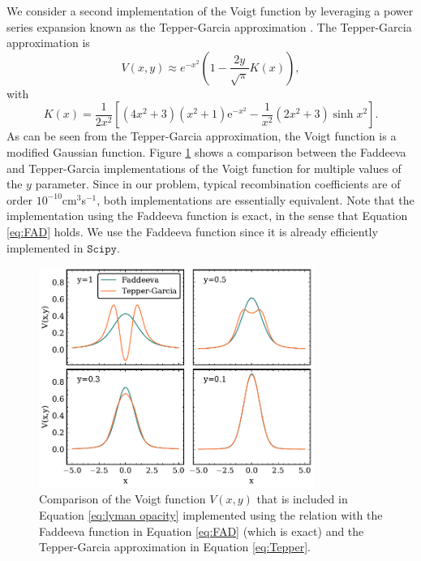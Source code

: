We consider a second implementation of the Voigt function by leveraging a power series expansion known as the Tepper-Garcia approximation \cite{Tepper_Garc_a_2006}. The Tepper-Garcia approximation is
\begin{equation}\label{eq:Tepper}
        V(x,y)\approx e^{-x^2}\left( 1-\frac{2y}{\sqrt{\pi}} K(x) \right),
\end{equation}
with
\begin{equation}
        K(x)=\frac1{2x^2}\left[(4x^2+3)\left(x^2+1\right)\mathrm{e}^{-x^2}-\frac1{x^2}(2x^2+3)\sinh x^2\right].
\end{equation}
As can be seen from the Tepper-Garcia approximation, the Voigt function is a modified Gaussian function. Figure \ref{fig: VOIGT APPROX} shows a comparison between the Faddeeva and Tepper-Garcia implementations of the Voigt function for multiple values of the $y$ parameter. Since in our problem, typical recombination coefficients are of order $10^{-10}$cm$^3$s$^{-1}$, both implementations are essentially equivalent. Note that the implementation using the Faddeeva function is exact, in the sense that Equation \ref{eq:FAD} holds. We use the Faddeeva function since it is already efficiently implemented in $\texttt{Scipy}$.

\begin{figure}[ht]
        \centering
        \includegraphics[width=0.8\textwidth]{img/ML/TP-FA.pdf}
        \caption{Comparison of the Voigt function $V(x,y)$ that is included in Equation \ref{eq:lyman opacity} implemented using the relation with the Faddeeva function in Equation \ref{eq:FAD} (which is exact) and the Tepper-Garcia approximation in Equation \ref{eq:Tepper}.}
        \label{fig: VOIGT APPROX}     
\end{figure}

